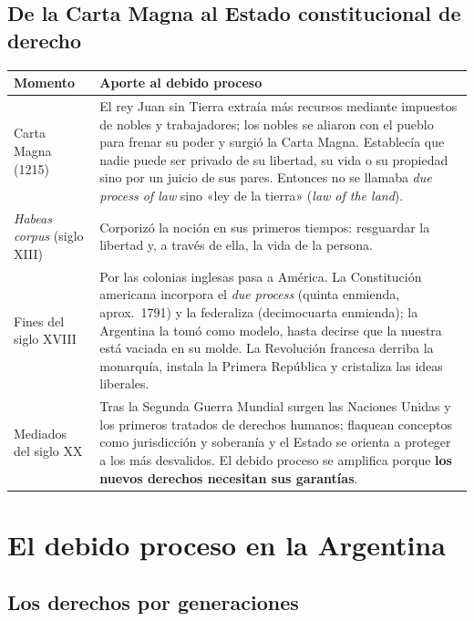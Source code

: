\documentclass[12pt,oneside]{book}
\renewcommand{\arraystretch}{1.15}
\begin{document}
\subsection{De la Carta Magna al Estado constitucional de derecho}

\begin{table}[H]
\centering
\renewcommand{\arraystretch}{1.25}
\begin{tabularx}{\textwidth}{>{\RaggedRight\arraybackslash}p{}>{\RaggedRight\arraybackslash}X}
\toprule
\textbf{Momento} & \textbf{Aporte al debido proceso} \\
\midrule
Carta Magna (1215) & El rey Juan sin Tierra extraía más recursos mediante impuestos de nobles y trabajadores; los nobles se aliaron con el pueblo para frenar su poder y surgió la Carta Magna. Establecía que nadie puede ser privado de su libertad, su vida o su propiedad sino por un juicio de sus pares. Entonces no se llamaba \textit{due process of law} sino «ley de la tierra» (\textit{law of the land}). \\
\addlinespace
\textit{Habeas corpus} (siglo XIII) & Corporizó la noción en sus primeros tiempos: resguardar la libertad y, a través de ella, la vida de la persona. \\
\addlinespace
Fines del siglo XVIII & Por las colonias inglesas pasa a América. La Constitución americana incorpora el \textit{due process} (quinta enmienda, aprox.\ 1791) y la federaliza (decimocuarta enmienda); la Argentina la tomó como modelo, hasta decirse que la nuestra está vaciada en su molde. La Revolución francesa derriba la monarquía, instala la Primera República y cristaliza las ideas liberales. \\
\addlinespace
Mediados del siglo XX & Tras la Segunda Guerra Mundial surgen las Naciones Unidas y los primeros tratados de derechos humanos; flaquean conceptos como jurisdicción y soberanía y el Estado se orienta a proteger a los más desvalidos. El debido proceso se amplifica porque \textbf{los nuevos derechos necesitan sus garantías}. \\
\bottomrule
\end{tabularx}
\end{table}

\section{El debido proceso en la Argentina}

\subsection{Los derechos por generaciones}
\end{document}
